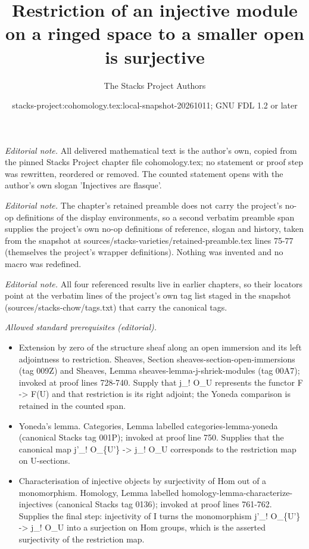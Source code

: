 \documentclass[10pt,a4paper]{amsart}
\title{Restriction of an injective module on a ringed space to a smaller open is surjective}
\author{The Stacks Project Authors}
\date{stacks-project:cohomology.tex:local-snapshot-20261011; GNU FDL 1.2 or later}
\theoremstyle{plain}
\theoremstyle{definition}
\theoremstyle{remark}
\numberwithin{equation}{subsection}
\begin{document}
\maketitle
\noindent\textit{Editorial note.} All delivered mathematical text is the author's own, copied from the pinned Stacks Project chapter file cohomology.tex; no statement or proof step was rewritten, reordered or removed. The counted statement opens with the author's own slogan 'Injectives are flasque'.\par\medskip
\noindent\textit{Editorial note.} The chapter's retained preamble does not carry the project's no-op definitions of the display environments, so a second verbatim preamble span supplies the project's own no-op definitions of reference, slogan and history, taken from the snapshot at sources/stacks-varieties/retained-preamble.tex lines 75-77 (themselves the project's wrapper definitions). Nothing was invented and no macro was redefined.\par\medskip
\noindent\textit{Editorial note.} All four referenced results live in earlier chapters, so their locators point at the verbatim lines of the project's own tag list staged in the snapshot (sources/stacks-chow/tags.txt) that carry the canonical tags.\par\medskip
\noindent\textit{Allowed standard prerequisites (editorial).}\begin{itemize}
\item Extension by zero of the structure sheaf along an open immersion and its left adjointness to restriction. Sheaves, Section sheaves-section-open-immersions (tag 009Z) and Sheaves, Lemma sheaves-lemma-j-shriek-modules (tag 00A7); invoked at proof lines 728-740. Supply that j\_! O\_U represents the functor F -> F(U) and that restriction is its right adjoint; the Yoneda comparison is retained in the counted span.
\item Yoneda's lemma. Categories, Lemma labelled categories-lemma-yoneda (canonical Stacks tag 001P); invoked at proof line 750. Supplies that the canonical map j'\_! O\_\{U'\} -> j\_! O\_U corresponds to the restriction map on U-sections.
\item Characterisation of injective objects by surjectivity of Hom out of a monomorphism. Homology, Lemma labelled homology-lemma-characterize-injectives (canonical Stacks tag 0136); invoked at proof lines 761-762. Supplies the final step: injectivity of I turns the monomorphism j'\_! O\_\{U'\} -> j\_! O\_U into a surjection on Hom groups, which is the asserted surjectivity of the restriction map.
\end{itemize}\medskip
\end{document}
